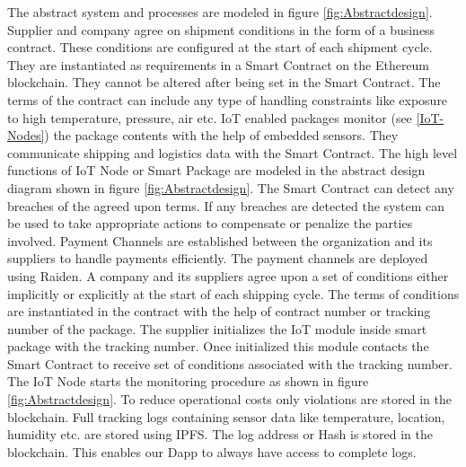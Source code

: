 The abstract system and processes are modeled in figure \ref{fig:Abstractdesign}. Supplier and company agree on shipment conditions in the form of a business contract. These conditions are configured at the start of each shipment cycle. They are instantiated as requirements in a Smart Contract on the Ethereum blockchain. They cannot be altered after being set in the Smart Contract. The terms of the contract can include any type of handling constraints like exposure to high temperature, pressure, air etc. IoT enabled packages monitor (see \ref{IoT-Nodes}) the package contents with the help of embedded sensors. They communicate shipping and logistics data with the Smart Contract. The high level functions of IoT Node or Smart Package are modeled in the abstract design diagram shown in figure \ref{fig:Abstractdesign}.
\clearpage
The Smart Contract can detect any breaches of the agreed upon terms. If any breaches are detected the system can be used to take appropriate actions to compensate or penalize the parties involved. Payment Channels are established between the organization and its suppliers to handle payments efficiently. The payment channels are deployed using Raiden. A company and its suppliers agree upon a set of conditions either implicitly or explicitly at the start of each shipping cycle. The terms of conditions are instantiated in the contract with the help of contract number or tracking number of the package. The supplier initializes the IoT module inside smart package with the tracking number. Once initialized this module contacts the Smart Contract to receive set of conditions associated with the tracking number. The IoT Node starts the monitoring procedure as shown in figure \ref{fig:Abstractdesign}. To reduce operational costs only violations are stored in the blockchain. Full tracking logs containing sensor data like temperature, location, humidity etc. are stored using IPFS. The log address or Hash is stored in the blockchain. This enables our Dapp to always have access to complete logs.

